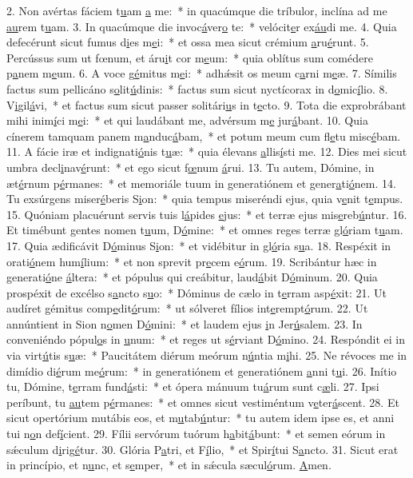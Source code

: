 2. Non avértas fáciem t\uline{u}am \uline{a} me:~* in quacúmque die tríbulor, inclína ad me \uline{au}rem t\uline{u}am.
3. In quacúmque die invoc\uline{á}ver\uline{o} te:~* velócit\uline{e}r ex\uline{áu}di me.
4. Quia defecérunt sicut fumus d\uline{i}es m\uline{e}i:~* et ossa mea sicut crémium \uline{a}ru\uline{é}runt.
5. Percússus sum ut fœnum, et áru\uline{i}t cor m\uline{e}um:~* quia oblítus sum comédere p\uline{a}nem m\uline{e}um.
6. A voce g\uline{é}mitus m\uline{e}i:~* adhǽsit os meum c\uline{a}rni m\uline{e}æ.
7. Símilis factus sum pellicáno s\uline{o}lit\uline{ú}dinis:~* factus sum sicut nyctícorax in d\uline{o}mic\uline{í}lio.
8. V\uline{i}gil\uline{á}vi,~* et factus sum sicut passer solitári\uline{u}s in t\uline{e}cto.
9. Tota die exprobrábant mihi inim\uline{í}ci m\uline{e}i:~* et qui laudábant me, advérsum m\uline{e} jur\uline{á}bant.
10. Quia cínerem tamquam panem m\uline{a}nduc\uline{á}bam,~* et potum meum cum fl\uline{e}tu misc\uline{é}bam.
11. A fácie iræ et indignati\uline{ó}nis t\uline{u}æ:~* quia élevans \uline{a}llis\uline{í}sti me.
12. Dies mei sicut umbra decl\uline{i}nav\uline{é}runt:~* et ego sicut f\uline{œ}num \uline{á}rui.
13. Tu autem, Dómine, in æt\uline{é}rnum p\uline{é}rmanes:~* et memoriále tuum in generatiónem et gener\uline{a}ti\uline{ó}nem.
14. Tu exsúrgens miser\uline{é}beris S\uline{i}on:~* quia tempus miseréndi ejus, quia v\uline{e}nit t\uline{e}mpus.
15. Quóniam placuérunt servis tuis l\uline{á}pides \uline{e}jus:~* et terræ ejus mis\uline{e}reb\uline{ú}ntur.
16. Et timébunt gentes nomen t\uline{u}um, D\uline{ó}mine:~* et omnes reges terræ gl\uline{ó}riam t\uline{u}am.
17. Quia ædificávit D\uline{ó}minus S\uline{i}on:~* et vidébitur in gl\uline{ó}ria s\uline{u}a.
18. Respéxit in orati\uline{ó}nem hum\uline{í}lium:~* et non sprevit pr\uline{e}cem e\uline{ó}rum.
19. Scribántur hæc in generati\uline{ó}ne \uline{á}ltera:~* et pópulus qui creábitur, laud\uline{á}bit D\uline{ó}minum.
20. Quia prospéxit de excélso s\uline{a}ncto s\uline{u}o:~* Dóminus de cælo in t\uline{e}rram asp\uline{é}xit:
21. Ut audíret gémitus comp\uline{e}dit\uline{ó}rum:~* ut sólveret fílios int\uline{e}rempt\uline{ó}rum.
22. Ut annúntient in Sion n\uline{o}men D\uline{ó}mini:~* et laudem ejus \uline{i}n Jer\uline{ú}salem.
23. In conveniéndo pópul\uline{o}s in \uline{u}num:~* et reges ut s\uline{é}rviant D\uline{ó}mino.
24. Respóndit ei in via virt\uline{ú}tis s\uline{u}æ:~* Paucitátem diérum meórum n\uline{ú}ntia m\uline{i}hi.
25. Ne révoces me in dimídio di\uline{é}rum me\uline{ó}rum:~* in generatiónem et generatiónem \uline{a}nni t\uline{u}i.
26. Inítio tu, Dómine, t\uline{e}rram fund\uline{á}sti:~* et ópera mánuum tu\uline{á}rum sunt c\uline{æ}li.
27. Ipsi períbunt, tu \uline{au}tem p\uline{é}rmanes:~* et omnes sicut vestiméntum v\uline{e}ter\uline{á}scent.
28. Et sicut opertórium mutábis eos, et m\uline{u}tab\uline{ú}ntur:~* tu autem idem ipse es, et anni tui n\uline{o}n def\uline{í}cient.
29. Fílii servórum tuórum h\uline{a}bit\uline{á}bunt:~* et semen eórum in sǽculum d\uline{i}rig\uline{é}tur.
30. Glória P\uline{a}tri, et F\uline{í}lio,~* et Spir\uline{í}tui S\uline{a}ncto.
31. Sicut erat in princípio, et n\uline{u}nc, et s\uline{e}mper,~* et in sǽcula sæcul\uline{ó}rum. \uline{A}men.
